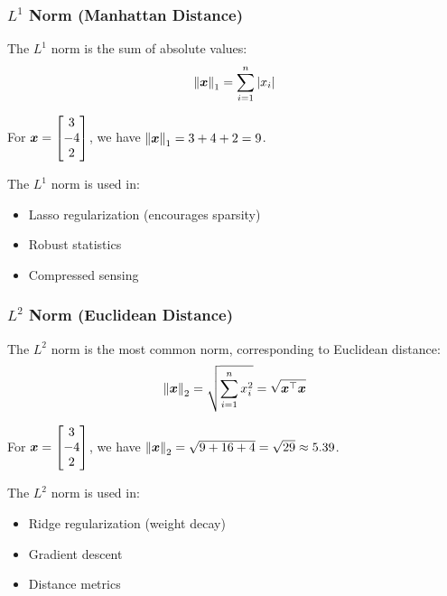\subsubsection{$L^1$ Norm (Manhattan Distance)}

The $L^1$ norm is the sum of absolute values:
\begin{equation}
    \left\lVert\boldsymbol{x}\right\rVert_1 = \sum_{i=1}^{n} |x_i|
\end{equation}

\begin{example}
For $\boldsymbol{x} = \begin{bmatrix} 3 \\ -4 \\ 2 \end{bmatrix}$, we have $\left\lVert\boldsymbol{x}\right\rVert_1 = 3 + 4 + 2 = 9$.
\end{example}

The $L^1$ norm is used in:
\begin{itemize}
    \item Lasso regularization (encourages sparsity)
    \item Robust statistics
    \item Compressed sensing
\end{itemize}

\subsubsection{$L^2$ Norm (Euclidean Distance)}

The $L^2$ norm is the most common norm, corresponding to Euclidean distance:
\begin{equation}
    \left\lVert\boldsymbol{x}\right\rVert_2 = \sqrt{\sum_{i=1}^{n} x_i^2} = \sqrt{\boldsymbol{x}^\top\boldsymbol{x}}
\end{equation}

\begin{example}
For $\boldsymbol{x} = \begin{bmatrix} 3 \\ -4 \\ 2 \end{bmatrix}$, we have $\left\lVert\boldsymbol{x}\right\rVert_2 = \sqrt{9 + 16 + 4} = \sqrt{29} \approx 5.39$.
\end{example}

The $L^2$ norm is used in:
\begin{itemize}
    \item Ridge regularization (weight decay)
    \item Gradient descent
    \item Distance metrics
\end{itemize}

